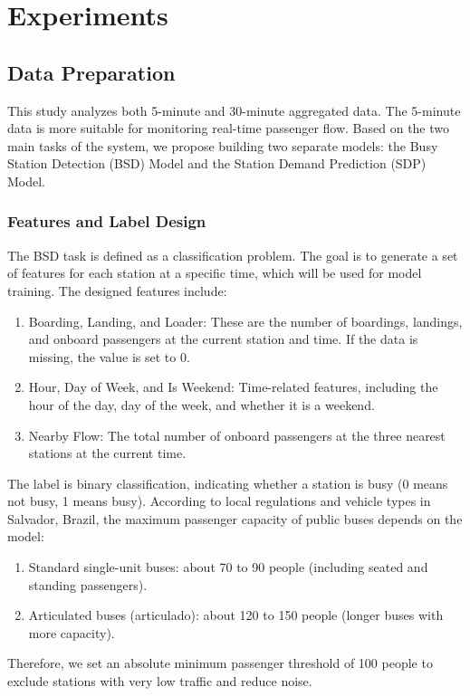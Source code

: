 \documentclass[11pt]{article} %
\begin{document}
\section{Experiments}
\subsection{Data Preparation}
This study analyzes both 5-minute and 30-minute aggregated data. The 5-minute data is more suitable for monitoring real-time passenger flow. Based on the two main tasks of the system, we propose building two separate models: the Busy Station Detection (BSD) Model and the Station Demand Prediction (SDP) Model.

\subsubsection{Features and Label Design}
The BSD task is defined as a classification problem. The goal is to generate a set of features for each station at a specific time, which will be used for model training. The designed features include:

\begin{enumerate}
\item Boarding, Landing, and Loader: These are the number of boardings, landings, and onboard passengers at the current station and time. If the data is missing, the value is set to 0.
\item Hour, Day of Week, and Is Weekend: Time-related features, including the hour of the day, day of the week, and whether it is a weekend.
\item  Nearby Flow: The total number of onboard passengers at the three nearest stations at the current time.
\end{enumerate}

The label is binary classification, indicating whether a station is busy (0 means not busy, 1 means busy). According to local regulations and vehicle types in Salvador, Brazil, the maximum passenger capacity of public buses depends on the model:

\begin{enumerate}
\item Standard single-unit buses: about 70 to 90 people (including seated and standing passengers).
\item Articulated buses (articulado): about 120 to 150 people (longer buses with more capacity).
\end{enumerate}

Therefore, we set an absolute minimum passenger threshold of 100 people to exclude stations with very low traffic and reduce noise.
\end{document}
